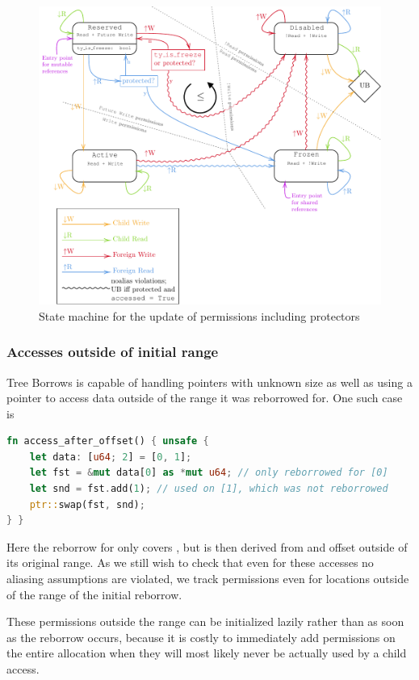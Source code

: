 \documentclass[a4paper,11pt]{article}
\theoremstyle{plain}
\theoremstyle{definition}
\theoremstyle{remark}
\newcommand{\tcode}[1]{\rstinline{#1}}
\begin{document}
\begin{figure}
    \includegraphics[width=\textwidth]{../figs/state-machine.pdf}
    \caption{State machine for the update of permissions including protectors}
    \label{fig:state-machine}
\end{figure}

\subsubsection{Accesses outside of initial range}

Tree Borrows is capable of handling pointers with unknown size as well as using
a pointer to access data outside of the range it was reborrowed for. One such case is
\begin{lstlisting}[language=rust]
fn access_after_offset() { unsafe {
    let data: [u64; 2] = [0, 1];
    let fst = &mut data[0] as *mut u64; // only reborrowed for [0]
    let snd = fst.add(1); // used on [1], which was not reborrowed
    ptr::swap(fst, snd);
} }
\end{lstlisting}
Here the reborrow for \tcode{fst} only covers \tcode{data[0]}, but \tcode{snd} is then derived from
\tcode{fst} and offset outside of its original range. As we still wish to check
that even for these accesses no aliasing assumptions are violated, we track
permissions even for locations outside of the range of the initial reborrow.

These permissions outside the range can be initialized lazily rather than as soon
as the reborrow occurs, because it is costly to immediately add permissions
on the entire allocation when they will most likely never be actually used by
a child access.
\end{document}
